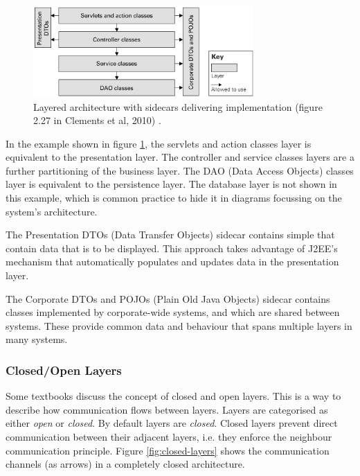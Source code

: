 \begin{figure}[h]
  \begin{center}
    \includegraphics[width=0.75\textwidth]{images/layered_with_multiple_sidecars.png}
  \end{center}
  \caption{Layered architecture with sidecars delivering implementation (figure 2.27 in Clements et al, 2010) \cite{clements2010documenting}.}
  \label{fig:sidecar2}
\end{figure}

In the example shown in figure \ref{fig:sidecar2}, the servlets and action classes layer is equivalent to the presentation layer.
The controller and service classes layers are a further partitioning of the business layer.
The DAO (Data Access Objects) classes layer is equivalent to the persistence layer.
The database layer is not shown in this example,
which is common practice to hide it in diagrams focussing on the system's architecture.

The Presentation DTOs (Data Transfer Objects) sidecar contains simple 
that contain data that is to be displayed.
This approach takes advantage of J2EE's mechanism that automatically populates and updates data in the presentation layer.

The Corporate DTOs and POJOs (Plain Old Java Objects) sidecar contains classes implemented by corporate-wide systems,
and which are shared between systems.
These provide common data and behaviour that spans multiple layers in many systems.

\subsubsection{Closed/Open Layers}

Some textbooks discuss the concept of closed and open layers.
This is a way to describe how communication flows between layers.
Layers are categorised as either \textsl{open} or \textsl{closed}.
By default layers are \textsl{closed}.
Closed layers prevent direct communication between their adjacent layers, i.e. they enforce the neighbour communication principle.
Figure \ref{fig:closed-layers} shows the communication channels (as arrows) in a completely closed architecture.

